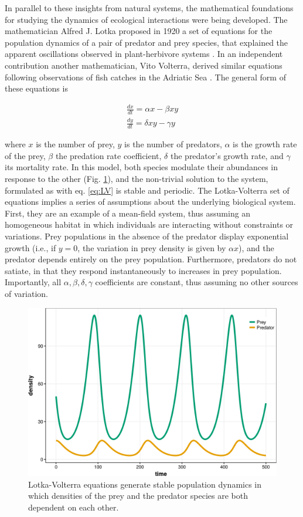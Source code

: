 In parallel to these insights from natural systems, the mathematical foundations for studying the dynamics of ecological interactions were being developed. The mathematician Alfred J. Lotka proposed in 1920 a set of equations for the population dynamics of a pair of predator and prey species, that explained the apparent oscillations observed in plant-herbivore systems \citep{Lotka1920}. In an independent contribution another mathematician, Vito Volterra, derived similar equations following observations of fish catches in the Adriatic Sea \citep{Volterra1928}. The general form of these equations is

\begin{equation}
\begin{array}{c}
\frac{dx}{dt} = \alpha x - \beta xy \\
\frac{dy}{dt} = \delta xy - \gamma y
\end{array}\label{eq:LV}
\end{equation}

where $x$ is the number of prey, $y$ is the number of predators, $\alpha$ is the growth rate of the prey, $\beta$ the predation rate coefficient, $\delta$ the predator's growth rate, and $\gamma$ its mortality rate. In this model, both species modulate their abundances in response to the other (Fig. \ref{fig:LV_example}), and the non-trivial solution to the system, formulated as with eq. \ref{eq:LV} is stable and periodic. The Lotka-Volterra set of equations implies a series of assumptions about the underlying biological system. First, they are an example of a mean-field system, thus assuming an homogeneous habitat in which individuals are interacting without constraints or variations. Prey populations in the absence of the predator display exponential growth (i.e., if $ y = 0$, the variation in prey density is given by $\alpha x$), and the predator depends entirely on the prey population. Furthermore, predators do not satiate, in that they respond instantaneously to increases in prey population. Importantly, all $\alpha , \beta , \delta , \gamma$ coefficients are constant, thus assuming no other sources of variation.

\begin{figure}[ht]
\centering
\includegraphics[width=.6\textwidth]{./Figures/intro/ecological_networks/LV_example.png}
\caption[2-species Lotka-Volterra system]{\color{Gray} Lotka-Volterra equations generate stable population dynamics in which densities of the prey and the predator species are both dependent on each other.}
\label{fig:LV_example}
\end{figure}

